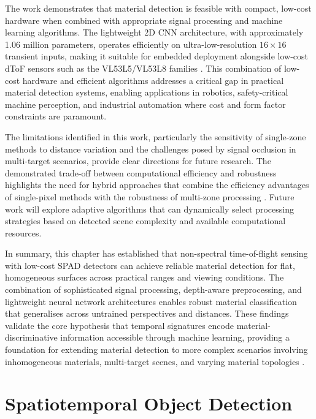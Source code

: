 \documentclass[12pt,a4paper,oneside]{report}
\let\oldchapter\chapter
\renewcommand{\chapter}{\thispagestyle{fancy}\oldchapter}
\begin{document}
The work demonstrates that material detection is feasible with compact, low-cost hardware when combined with appropriate signal processing and machine learning algorithms. The lightweight 2D CNN architecture, with approximately 1.06 million parameters, operates efficiently on ultra-low-resolution $16 \times 16$ transient inputs, making it suitable for embedded deployment alongside low-cost dToF sensors such as the VL53L5/VL53L8 families \cite{vl53l5cx2022}. This combination of low-cost hardware and efficient algorithms addresses a critical gap in practical material detection systems, enabling applications in robotics, safety-critical machine perception, and industrial automation where cost and form factor constraints are paramount.

The limitations identified in this work, particularly the sensitivity of single-zone methods to distance variation and the challenges posed by signal occlusion in multi-target scenarios, provide clear directions for future research. The demonstrated trade-off between computational efficiency and robustness highlights the need for hybrid approaches that combine the efficiency advantages of single-pixel methods with the robustness of multi-zone processing \cite{koerner2021,tontini2020}. Future work will explore adaptive algorithms that can dynamically select processing strategies based on detected scene complexity and available computational resources.

In summary, this chapter has established that non-spectral time-of-flight sensing with low-cost SPAD detectors can achieve reliable material detection for flat, homogeneous surfaces across practical ranges and viewing conditions. The combination of sophisticated signal processing, depth-aware preprocessing, and lightweight neural network architectures enables robust material classification that generalises across untrained perspectives and distances. These findings validate the core hypothesis that temporal signatures encode material-discriminative information accessible through machine learning, providing a foundation for extending material detection to more complex scenarios involving inhomogeneous materials, multi-target scenes, and varying material topologies \cite{su2016,becker2023,tafone2023}.

\newpage
\chapter{Spatiotemporal Object Detection}
\label{chap:spatiotemporal_object_detection}
\end{document}
